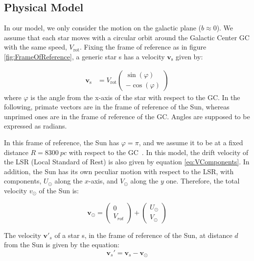 \subsection{Physical Model}\label{subsec:PhysicalModel}


In our model, we only consider the motion on the galactic plane ($b\approx0$). We assume that each star moves with a circular orbit around the Galactic Center GC with the same speed, $V_{\text{rot}}$. Fixing the frame of reference as in figure \ref{fig:FrameOfReference}, a generic star s has a velocity $\bm{v}_{\text{s}}$ given by:

\begin{equation}\label{eq:VComponents}
    \begin{aligned}
        \bm{v}_{\text{s}} &= V_{\text{rot}}\begin{pmatrix} \sin(\varphi) \\ -\cos(\varphi) \end{pmatrix}
    \end{aligned}
\end{equation}
\noindent
where $\varphi$ is the angle from the x-axis of the star with respect to the GC. In the following, primate vectors are in the frame of reference of the Sun, whereas unprimed ones are in the frame of reference of the GC. Angles are supposed to be expressed as radians.



In this frame of reference, the Sun has $\varphi = \pi$, and we assume it to be at a fixed distance $R=\qty{8300}{pc}$ with respect to the GC~\cite{GalacticKinematics}. In this model, the drift velocity of the LSR (Local Standard of Rest) is also given by equation \ref{eq:VComponents}. In addition, the Sun has its own peculiar motion with respect to the LSR, with components, $U_{\odot}$ along the $x$-axis, and $V_{\odot}$ along the $y$ one. Therefore, the total velocity $v_{\odot}$ of the Sun is:

\begin{equation}\label{eq:VSun}
    \bm{v}_{\odot} = \begin{pmatrix} 0 \\ V_{rot} \end{pmatrix} + \begin{pmatrix} U_{\odot} \\ V_{\odot} \end{pmatrix}
\end{equation}

\noindent
The velocity $\bm{v'}_s$ of a star s, in the frame of reference of the Sun, at distance $d$ from the Sun is given by the equation:
\begin{equation}\label{eq:ReferenceFrame}
    \bm{v}_s' = \bm{v}_s - \bm{v}_{\odot} 
\end{equation}

